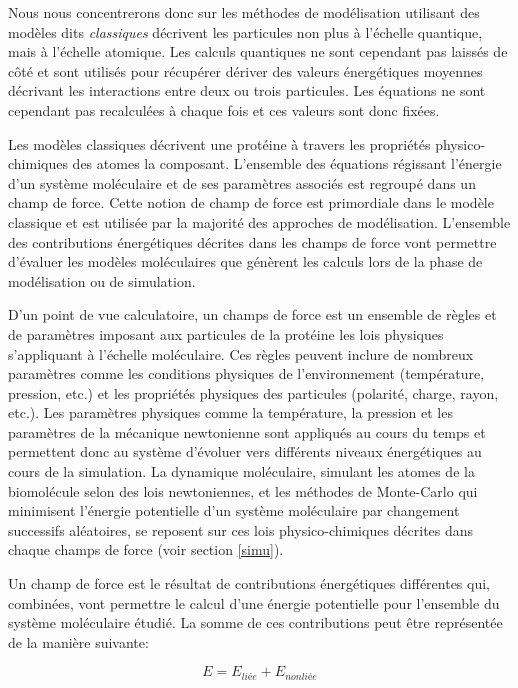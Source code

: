 Nous nous concentrerons donc sur les méthodes de modélisation utilisant des modèles dits \textit{classiques} décrivent les particules non plus à l'échelle quantique, mais à l'échelle atomique. Les calculs quantiques ne sont cependant pas laissés de côté et sont utilisés pour récupérer dériver des valeurs énergétiques moyennes décrivant les interactions entre deux ou trois particules. Les équations ne sont cependant pas recalculées à chaque fois et ces valeurs sont donc fixées.

 \label{forcefield}

Les modèles classiques décrivent une protéine à travers les propriétés physico-chimiques des atomes la composant. L'ensemble des équations régissant l'énergie d'un système moléculaire et de ses paramètres associés est regroupé dans un champ de force. Cette notion de champ de force est primordiale dans le modèle classique et est utilisée par la majorité des approches de modélisation. L'ensemble des contributions énergétiques décrites dans les champs de force vont permettre d'évaluer les modèles moléculaires que génèrent les calculs lors de la phase de modélisation ou de simulation.

D'un point de vue calculatoire, un champs de force est un ensemble de règles et de paramètres imposant aux particules de la protéine les lois physiques s'appliquant à l'échelle moléculaire. Ces règles peuvent inclure de nombreux paramètres comme les conditions physiques de l'environnement (température, pression, etc.) et les propriétés physiques des particules (polarité, charge, rayon, etc.). Les paramètres physiques comme la température, la pression et les paramètres de la mécanique newtonienne sont appliqués au cours du temps et permettent donc au système d'évoluer vers différents niveaux énergétiques au cours de la simulation. La dynamique moléculaire, simulant les atomes de la biomolécule selon des lois newtoniennes, et les méthodes de Monte-Carlo qui minimisent l'énergie potentielle d'un système moléculaire par changement successifs aléatoires, se reposent sur ces lois physico-chimiques décrites dans chaque champs de force (voir section \ref{simu}). 

Un champ de force est le résultat de contributions énergétiques différentes qui, combinées, vont permettre le calcul d'une énergie potentielle pour l'ensemble du système moléculaire étudié. La somme de ces contributions peut être représentée de la manière suivante:

$$E = E_{liée} + E_{nonliée}$$

